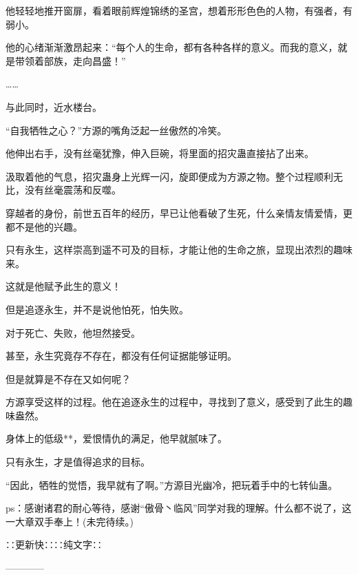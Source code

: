 \begin{this_body}
他轻轻地推开窗扉，看着眼前辉煌锦绣的圣宫，想着形形色色的人物，有强者，有弱小。

他的心绪渐渐激昂起来：“每个人的生命，都有各种各样的意义。而我的意义，就是带领着部族，走向昌盛！”

……

与此同时，近水楼台。

“自我牺牲之心？”方源的嘴角泛起一丝傲然的冷笑。

他伸出右手，没有丝毫犹豫，伸入巨碗，将里面的招灾蛊直接拈了出来。

汲取着他的气息，招灾蛊身上光辉一闪，旋即便成为方源之物。整个过程顺利无比，没有丝毫震荡和反噬。

穿越者的身份，前世五百年的经历，早已让他看破了生死，什么亲情友情爱情，更都不是他的兴趣。

只有永生，这样崇高到遥不可及的目标，才能让他的生命之旅，显现出浓烈的趣味来。

这就是他赋予此生的意义！

但是追逐永生，并不是说他怕死，怕失败。

对于死亡、失败，他坦然接受。

甚至，永生究竟存不存在，都没有任何证据能够证明。

但是就算是不存在又如何呢？

方源享受这样的过程。他在追逐永生的过程中，寻找到了意义，感受到了此生的趣味盎然。

身体上的低级**，爱恨情仇的满足，他早就腻味了。

只有永生，才是值得追求的目标。

“因此，牺牲的觉悟，我早就有了啊。”方源目光幽冷，把玩着手中的七转仙蛊。

ps：感谢诸君的耐心等待，感谢“傲骨丶临风”同学对我的理解。什么都不说了，这一大章双手奉上！(未完待续。)

∷更新快∷∷纯文字∷

------------

\end{this_body}

